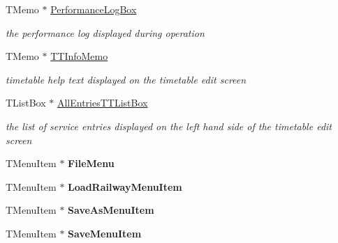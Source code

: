 \begin{DoxyCompactItemize}
\mbox{\label{class_t_interface_a76addd0eae1d81ecc29d7109aa1da54c}} 
T\+Memo $\ast$ \mbox{\hyperlink{class_t_interface_a76addd0eae1d81ecc29d7109aa1da54c}{Performance\+Log\+Box}}
\begin{DoxyCompactList}\small\item\em the performance log displayed during operation \end{DoxyCompactList}\item 
\mbox{\label{class_t_interface_a5f4cdf54d45ef2756fbcc7c1faeb7751}} 
T\+Memo $\ast$ \mbox{\hyperlink{class_t_interface_a5f4cdf54d45ef2756fbcc7c1faeb7751}{T\+T\+Info\+Memo}}
\begin{DoxyCompactList}\small\item\em timetable help text displayed on the timetable edit screen \end{DoxyCompactList}\item 
\mbox{\label{class_t_interface_a2186c4827761360ddb9bccc3d8ef4295}} 
T\+List\+Box $\ast$ \mbox{\hyperlink{class_t_interface_a2186c4827761360ddb9bccc3d8ef4295}{All\+Entries\+T\+T\+List\+Box}}
\begin{DoxyCompactList}\small\item\em the list of service entries displayed on the left hand side of the timetable edit screen \end{DoxyCompactList}\item 
\mbox{\label{class_t_interface_a60596fc589806809a947f92681a0eb76}} 
T\+Menu\+Item $\ast$ {\bfseries File\+Menu}
\item 
\mbox{\label{class_t_interface_a9a18bcb63978a68899e33d5650d1b0d1}} 
T\+Menu\+Item $\ast$ {\bfseries Load\+Railway\+Menu\+Item}
\item 
\mbox{\label{class_t_interface_aba64b040556635901c62e90177ae077d}} 
T\+Menu\+Item $\ast$ {\bfseries Save\+As\+Menu\+Item}
\item 
\mbox{\label{class_t_interface_a5cfb2e50d6b0a7c80e665076ed824bf7}} 
T\+Menu\+Item $\ast$ {\bfseries Save\+Menu\+Item}
\item 
\mbox{\label{class_t_interface_a8bdebb5d77cd0866470536cc6608083c}} 

\end{DoxyCompactItemize}
